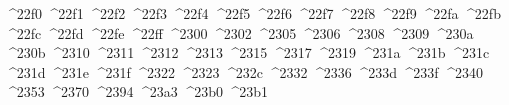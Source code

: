 {  ^^^^22f0%
  ^^^^22f1%
  ^^^^22f2%
  ^^^^22f3%
  ^^^^22f4%
  ^^^^22f5%
  ^^^^22f6%
  ^^^^22f7%
  ^^^^22f8%
  ^^^^22f9%
  ^^^^22fa%
  ^^^^22fb%
  ^^^^22fc%
  ^^^^22fd%
  ^^^^22fe%
  ^^^^22ff%
  ^^^^2300%
  ^^^^2302%
  ^^^^2305%
  ^^^^2306%
  ^^^^2308%
  ^^^^2309%
  ^^^^230a%
  ^^^^230b%
  ^^^^2310%
  ^^^^2311%
  ^^^^2312%
  ^^^^2313%
  ^^^^2315%
  ^^^^2317%
  ^^^^2319%
  ^^^^231a%
  ^^^^231b%
  ^^^^231c%
  ^^^^231d%
  ^^^^231e%
  ^^^^231f%
  ^^^^2322%
  ^^^^2323%
  ^^^^232c%
  ^^^^2332%
  ^^^^2336%
  ^^^^233d%
  ^^^^233f%
  ^^^^2340%
  ^^^^2353%
  ^^^^2370%
  ^^^^2394%
  ^^^^23a3%
  ^^^^23b0%
  ^^^^23b1%
}
